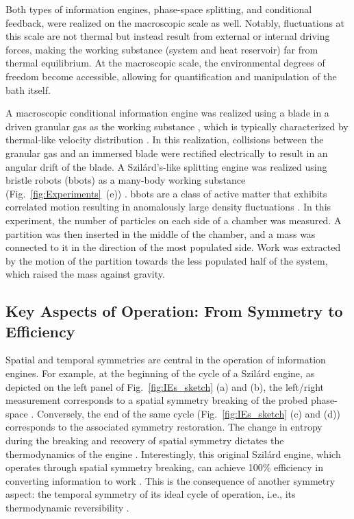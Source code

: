 \documentclass[aps, twocolumn,floatfix,showpacs, superscriptaddress]{revtex4-2}
\newcommand{\s}{Szil\'ard }
\begin{document}
Both types of information engines, phase-space splitting, and conditional feedback, were realized on the macroscopic scale as well. Notably, fluctuations at this scale are not thermal but instead result from external or internal driving forces, making the working substance (system and heat reservoir) far from thermal equilibrium. At the macroscopic scale, the environmental degrees of freedom become accessible, allowing for quantification and manipulation of the bath itself. 

A macroscopic conditional information engine was realized using a blade in a driven granular gas as the working substance \cite{lagoin_human-scale_2022}, which is typically characterized by thermal-like velocity distribution \cite{puglisi2012structure, gnoli_brownian_2013}. In this realization, collisions between the granular gas and an immersed blade were rectified electrically to result in an angular drift of the blade. A Szil\'ard's-like splitting engine was realized using bristle robots (bbots) as a many-body working substance (Fig.~\ref{fig:Experiments}~(e)) \cite{Chor2023}. bbots are a class of active matter that exhibits correlated motion \cite{deblais2018boundaries, giomi2013swarming} resulting in anomalously large density fluctuations \cite{ramaswamy2003active, ginelli2010large}. In this experiment, the number of particles on each side of a chamber was measured. A partition was then inserted in the middle of the chamber, and a mass was connected to it in the direction of the most populated side. Work was extracted by the motion of the partition towards the less populated half of the system, which raised the mass against gravity.

\subsection{Key Aspects of Operation: From Symmetry to Efficiency}

Spatial and temporal symmetries are central in the operation of information engines.
For example, at the beginning of the cycle of a \s engine, as depicted on the left panel of Fig.~\ref{fig:IEs_sketch} (a) and (b), the left/right measurement corresponds to a spatial symmetry breaking of the probed phase-space \cite{horowitz2013optimizing}.
Conversely, the end of the same cycle (Fig.~\ref{fig:IEs_sketch} (c) and (d)) corresponds to the associated symmetry restoration.
The change in entropy during the breaking and recovery of spatial symmetry dictates the thermodynamics of the engine \cite{horowitz2013optimizing, roldan_universal_2014}.
Interestingly, this original \s engine, which operates through spatial symmetry breaking, can achieve 100\% efficiency in converting information to work \cite{szilard1929entropieverminderung,Parrondo_2015}.
This is the consequence of another symmetry aspect: the temporal symmetry of its ideal cycle of operation, i.e., its thermodynamic reversibility \cite{horowitz2010nonequilibrium, horowitz2013optimizing, ashida_general_2014}.
\end{document}
